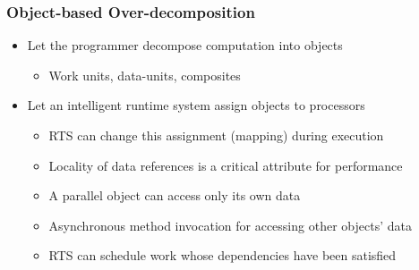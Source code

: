 
\begin{frame}
  \frametitle{Object-based Over-decomposition}
  \begin{itemize} 
    \item Let the programmer decompose computation into objects
    \begin{itemize}
       \item Work units, data-units, composites
    \end{itemize}
    \item Let an intelligent runtime system assign objects to processors
    \begin{itemize}
      \item RTS can change this assignment (mapping) during execution
      \item Locality of data references is a critical attribute for performance 
      \item A parallel object can access only its own data
      \item Asynchronous method invocation for accessing other objects’ data
      \item RTS can schedule work whose dependencies have been satisfied
    \end{itemize}
\end{itemize}
\end{frame}

